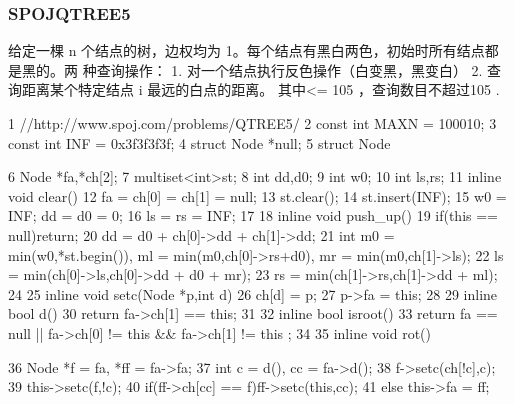 \documentclass[11pt]{article}
\begin{document}
\subsubsection{SPOJQTREE5}

\begin{Code}
     给定一棵 n 个结点的树，边权均为 1。每个结点有黑白两色，初始时所有结点都是黑的。两
     种查询操作：
     1. 对一个结点执行反色操作（白变黑，黑变白）
     2. 查询距离某个特定结点 i 最远的白点的距离。
     其中<= 105 ，查询数目不超过105 .

 1   //http://www.spoj.com/problems/QTREE5/
 2   const int MAXN = 100010;
 3   const int INF = 0x3f3f3f3f;
 4   struct Node *null;
 5   struct Node{
 6       Node *fa,*ch[2];
 7       multiset<int>st;
 8       int dd,d0;
 9       int w0;
10       int ls,rs;
11       inline void clear(){
12           fa = ch[0] = ch[1] = null;
13           st.clear();
14           st.insert(INF);
15           w0 = INF; dd = d0 = 0;
16           ls = rs = INF;
17       }
18       inline void push_up(){
19           if(this == null)return;
20           dd = d0 + ch[0]->dd + ch[1]->dd;
21           int m0 = min(w0,*st.begin()), ml = min(m0,ch[0]->rs+d0), mr
                 = min(m0,ch[1]->ls);
22           ls = min(ch[0]->ls,ch[0]->dd + d0 + mr);
23           rs = min(ch[1]->rs,ch[1]->dd + ml);
24       }
25       inline void setc(Node *p,int d){
26           ch[d] = p;
27           p->fa = this;
28       }
29       inline bool d(){
30           return fa->ch[1] == this;
31       }
32       inline bool isroot(){
33           return fa == null || fa->ch[0] != this && fa->ch[1] != this
                ;
34       }
35       inline void rot(){
36           Node *f = fa, *ff = fa->fa;
37           int c = d(), cc = fa->d();
38           f->setc(ch[!c],c);
39           this->setc(f,!c);
40           if(ff->ch[cc] == f)ff->setc(this,cc);
41           else this->fa = ff;


}}
\end{Code}
\end{document}
